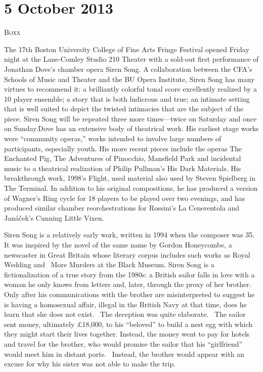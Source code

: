 \chapter{5 October 2013}

\textsc{Boxx}

The 17th Boston University College of Fine Arts Fringe Festival opened Friday night at the Lane-Comley Studio 210 Theater with a sold-out first performance of Jonathan Dove’s chamber opera Siren Song. A collaboration between the CFA’s Schools of Music and Theater and the BU Opera Institute, Siren Song has many virtues to recommend it: a brilliantly colorful tonal score excellently realized by a 10 player ensemble; a story that is both ludicrous and true; an intimate setting that is well suited to depict the twisted intimacies that are the subject of the piece. Siren Song will be repeated three more times—twice on Saturday and once on Sunday.Dove has an extensive body of theatrical work. His earliest stage works were “community operas,” works intended to involve large numbers of participants, especially youth. His more recent pieces include the operas The Enchanted Pig, The Adventures of Pinocchio, Mansfield Park and incidental music to a theatrical realization of Philip Pullman’s His Dark Materials. His breakthrough work, 1998’s Flight, used material also used by Steven Spielberg in The Terminal. In addition to his original compositions, he has produced a version of Wagner’s Ring cycle for 18 players to be played over two evenings, and has produced similar chamber reorchestrations for Rossini’s La Cenerentola and Janáček’s Cunning Little Vixen.

Siren Song is a relatively early work, written in 1994 when the composer was 35. It was inspired by the novel of the same name by Gordon Honeycombe, a newscaster in Great Britain whose literary corpus includes such works as Royal Wedding and  More Murders at the Black Museum. Siren Song is a fictionalization of a true story from the 1980s: a British sailor falls in love with a woman he only knows from letters and, later, through the proxy of her brother. Only after his communications with the brother are misinterpreted to suggest he is having a homosexual affair, illegal in the British Navy at that time, does he learn that she does not exist.  The deception was quite elaborate.  The sailor sent money, ultimately £18,000, to his “beloved” to build a nest egg with which they might start their lives together. Instead, the money went to pay for hotels and travel for the brother, who would promise the sailor that his “girlfriend” would meet him in distant ports.  Instead, the brother would appear with an excuse for why his sister was not able to make the trip.

